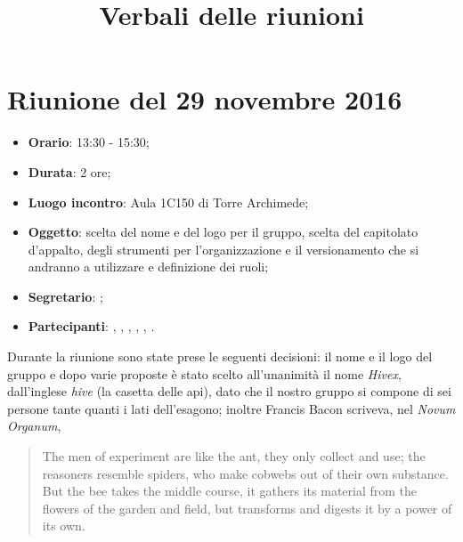 


\author{\PB}
\supervisor{\GG}
\title{Verbali delle riunioni}



\maketitle

\section{Riunione del 29 novembre 2016}

\begin{itemize}
	\item \textbf{Orario}: 13:30 - 15:30;
	\item \textbf{Durata}: 2 ore;
	\item \textbf{Luogo incontro}: Aula 1C150 di Torre Archimede; 
	\item \textbf{Oggetto}: scelta del nome e del logo per il gruppo, scelta del capitolato d'appalto, degli strumenti per l'organizzazione e il versionamento che si andranno a utilizzare e definizione dei ruoli;
	\item \textbf{Segretario}: \LB; 
	\item \textbf{Partecipanti}: \AZ, \GG, \LB, \LS, \MM, \PB.
\end{itemize}

Durante la riunione sono state prese le seguenti decisioni:
il nome e il logo del gruppo e dopo varie proposte è stato scelto all'unanimità il nome \emph{Hivex}, dall'inglese \emph{hive} (la casetta delle api), dato che il nostro gruppo si compone di sei persone tante quanti i lati dell'esagono; inoltre Francis Bacon scriveva, nel \emph{Novum Organum},
\begin{quote}
	The men of experiment are like the ant, they only collect and use; the reasoners resemble spiders, who make cobwebs out of their own substance. But the bee takes the middle course, it gathers its material from the flowers of the garden and field, but transforms and digests it by a power of its own.
\end{quote}

